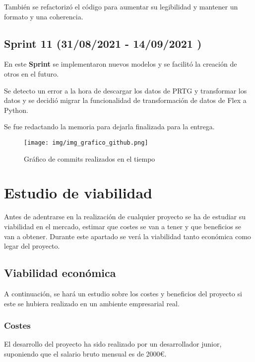 También se refactorizó el código para aumentar su legibilidad y mantener un formato y una coherencia.

\subsection{Sprint 11  (31/08/2021 - 14/09/2021 )}
En este \textbf{Sprint} se implementaron nuevos modelos y se facilitó la creación de otros en el futuro.

Se detecto un error a la hora de descargar los datos de PRTG y transformar los datos y se decidió migrar la funcionalidad de transformación de datos de Flex a Python.

Se fue redactando la memoria para dejarla finalizada para la entrega.


\begin{figure}[h]
	\centering
	\texttt{[image: img/img\_grafico\_github.png]}
	\caption{Gráfico de commits realizados en el tiempo}
	\label{img_grafico_github}
\end{figure}
\newpage

\section{Estudio de viabilidad}

Antes de adentrarse en la realización de cualquier proyecto se ha de estudiar su viabilidad en el mercado, estimar que costes se van a tener y que beneficios se van a obtener. Durante este apartado se verá la viabilidad tanto económica como legar del proyecto.

\subsection{Viabilidad económica}
A continuación, se hará un estudio sobre los costes y beneficios del proyecto si este se hubiera realizado en un ambiente empresarial real.

\subsubsection{Costes}


El desarrollo del proyecto ha sido realizado por un desarrollador junior, suponiendo que el salario bruto mensual es de 2000€.


